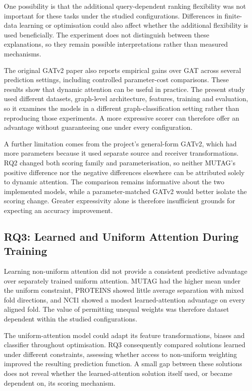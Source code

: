 \documentclass[11pt,a4paper]{article}
\begin{document}
One possibility is that the additional query-dependent ranking flexibility was not important for these tasks under the studied configurations. Differences in finite-data learning or optimisation could also affect whether the additional flexibility is used beneficially. The experiment does not distinguish between these explanations, so they remain possible interpretations rather than measured mechanisms.

The original GATv2 paper also reports empirical gains over GAT across several prediction settings, including controlled parameter-cost comparisons. These results show that dynamic attention can be useful in practice. The present study used different datasets, graph-level architecture, features, training and evaluation, so it examines the models in a different graph-classification setting rather than reproducing those experiments. A more expressive scorer can therefore offer an advantage without guaranteeing one under every configuration.

A further limitation comes from the project's general-form GATv2, which had more parameters because it used separate source and receiver transformations. RQ2 changed both scoring family and parameterisation, so neither MUTAG's positive difference nor the negative differences elsewhere can be attributed solely to dynamic attention. The comparison remains informative about the two implemented models, while a parameter-matched GATv2 would better isolate the scoring change. Greater expressivity alone is therefore insufficient grounds for expecting an accuracy improvement.

\subsection{RQ3: Learned and Uniform Attention During Training}
\label{sec:discussion-rq3}

Learning non-uniform attention did not provide a consistent predictive advantage over separately trained uniform attention. MUTAG had the higher mean under the uniform constraint, PROTEINS showed little average separation with mixed fold directions, and NCI1 showed a modest learned-attention advantage on every aligned fold. The value of permitting unequal weights was therefore dataset dependent within the studied configurations.

The uniform-attention model could adapt its feature transformations, biases and classifier throughout optimisation. RQ3 consequently compared solutions learned under different constraints, assessing whether access to non-uniform weighting improved the resulting prediction function. A small gap between these solutions does not reveal whether the learned-attention solution itself used, or became dependent on, its scoring mechanism.
\end{document}
